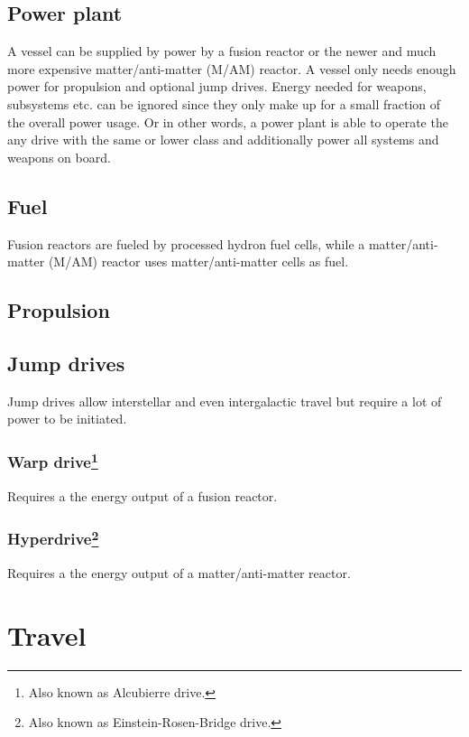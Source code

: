 \subsection{Power plant}

A vessel can be supplied by power by a fusion reactor or the newer and much more expensive matter/anti-matter (M/AM) reactor. A vessel only needs enough power for propulsion and optional jump drives. Energy needed for weapons, subsystems etc. can be ignored since they only make up for a small fraction of the overall power usage. Or in other words, a power plant is able to operate the any drive with the same or lower class and additionally power all systems and weapons on board.

\subsection{Fuel}
\label{sub:Fuel}

Fusion reactors are fueled by processed hydron fuel cells, while  a matter/anti-matter (M/AM) reactor uses matter/anti-matter cells as fuel.

\subsection{Propulsion}


\subsection{Jump drives}

Jump drives allow interstellar and even intergalactic travel but require a lot of power to be initiated.

\subsubsection[Warp drive]{Warp drive\footnote{Also known as Alcubierre drive.}}

Requires a the energy output of a fusion reactor.

\subsubsection[Hyperdrive]{Hyperdrive\footnote{Also known as Einstein-Rosen-Bridge drive.}}

Requires a the energy output of a matter/anti-matter reactor.

\section{Travel}
\label{sec:Travel}

